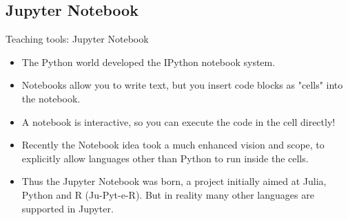 \documentclass[11pt]{beamer}
\begin{document}
\subsection{Jupyter Notebook}
%
\begin{frame}{Teaching tools: Jupyter Notebook}
\begin{itemize}
\item The Python world developed the IPython notebook system. 
\item Notebooks  allow you to write text, but you insert code blocks as "cells" into the notebook. 
\item A notebook is interactive, so you can execute the code in the cell directly!
\item Recently the Notebook idea took a much enhanced vision and scope, to explicitly allow languages other than Python to run inside the cells. 
\item Thus the Jupyter Notebook was born, a project initially aimed at Julia, Python and R (Ju-Pyt-e-R). But in reality many other languages are supported in Jupyter.
\end{itemize}
\end{frame}
\end{document}
